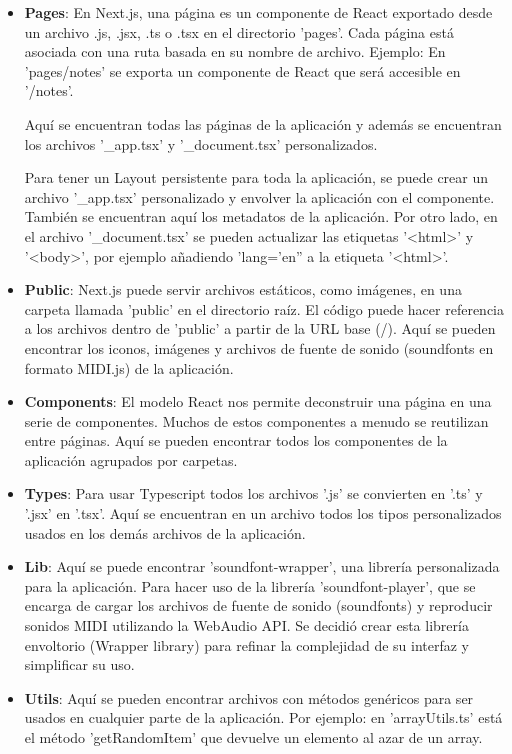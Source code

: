 \documentclass[12pt,twoside,titlepage]{report}
\begin{document}
\begin{itemize}
    \item \textbf{Pages}: En Next.js, una página es un componente de React exportado desde un archivo .js, .jsx, .ts o .tsx en el directorio 'pages'. Cada página está asociada con una ruta basada en su nombre de archivo. Ejemplo: En 'pages/notes' se exporta un componente de React que será accesible en '/notes'.

    Aquí se encuentran todas las páginas de la aplicación y además se encuentran los archivos '\_app.tsx' y '\_document.tsx' personalizados. 
    
    Para tener un Layout persistente para toda la aplicación, se puede crear un archivo '\_app.tsx' personalizado y envolver la aplicación con el componente. También se encuentran aquí los metadatos de la aplicación. Por otro lado, en el archivo '\_document.tsx' se pueden actualizar las etiquetas '<html>' y '<body>', por ejemplo añadiendo 'lang='en'' a la etiqueta '<html>'. 
    \item \textbf{Public}: Next.js puede servir archivos estáticos, como imágenes, en una carpeta llamada 'public' en el directorio raíz. El código puede hacer referencia a los archivos dentro de 'public' a partir de la URL base (/). Aquí se pueden encontrar los iconos, imágenes y archivos de fuente de sonido (soundfonts en formato MIDI.js) de la aplicación.
    \item \textbf{Components}: El modelo React nos permite deconstruir una página en una serie de componentes. Muchos de estos componentes a menudo se reutilizan entre páginas. Aquí se pueden encontrar todos los componentes de la aplicación agrupados por carpetas.
    \item \textbf{Types}: Para usar Typescript todos los archivos '.js' se convierten en '.ts' y '.jsx' en '.tsx'. Aquí se encuentran en un archivo todos los tipos personalizados usados en los demás archivos de la aplicación.
    \item \textbf{Lib}:  Aquí se puede encontrar 'soundfont-wrapper', una librería personalizada para la aplicación. Para hacer uso de la librería 'soundfont-player', que se encarga de cargar los archivos de fuente de sonido (soundfonts) y reproducir sonidos MIDI utilizando la WebAudio API.  Se decidió crear esta librería envoltorio (Wrapper library) para refinar la complejidad de su interfaz y simplificar su uso.
    \item \textbf{Utils}: Aquí se pueden encontrar archivos con métodos genéricos para ser usados en cualquier parte de la aplicación. Por ejemplo: en 'arrayUtils.ts' está el método 'getRandomItem' que devuelve un elemento al azar de un array.

\end{itemize}
\end{document}
